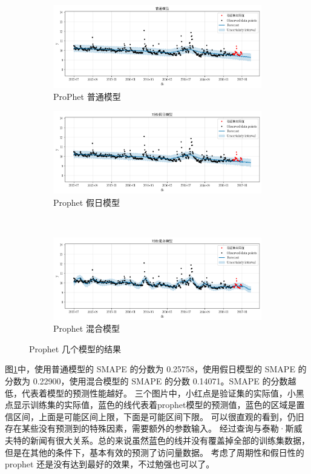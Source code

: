 \begin{figure}[htbp]
	\centering
	\begin{subfigure}{.5\textwidth}
		\centering
		\includegraphics[width=\linewidth]{figures/prophet_normal.png}
		\caption{ProPhet 普通模型}
	\end{subfigure}%
	\begin{subfigure}{.5\textwidth}
		\centering
		\includegraphics[width=\linewidth]{figures/prophet_holidays.png}
		\caption{Prophet 假日模型}
	\end{subfigure}\\
	\begin{subfigure}{\textwidth}
		\centering
		\includegraphics[width=\linewidth]{figures/prophet_mix.png}
		\caption{Prophet 混合模型}
	\end{subfigure}
	\caption{Prophet 几个模型的结果}
	\label{compare_model}
\end{figure}

图\ref{compare_model}中，使用普通模型的 SMAPE 的分数为 0.25758，使用假日模型的 SMAPE 的分数为 0.22900，使用混合模型的 SMAPE 的分数 0.14071。SMAPE 的分数越低，代表着模型的预测性能越好。
三个图片中，小红点是验证集的实际值，小黑点显示训练集的实际值，蓝色的线代表着prophet模型的预测值，蓝色的区域是置信区间，上面是可能区间上限，下面是可能区间下限。
可以很直观的看到，仍旧存在某些没有预测到的特殊因素，需要额外的参数输入。
经过查询与泰勒·斯威夫特的新闻有很大关系。总的来说虽然蓝色的线并没有覆盖掉全部的训练集数据，但是在其他的条件下，基本有效的预测了访问量数据。
考虑了周期性和假日性的 prophet 还是没有达到最好的效果，不过勉强也可以了。

